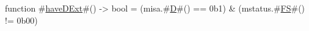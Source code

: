 function #\hyperref[sailRISCVzhaveDExt]{haveDExt}#()    -> bool = (misa.#\hyperref[sailRISCVzD]{D}#() == 0b1) & (mstatus.#\hyperref[sailRISCVzFS]{FS}#() != 0b00)
